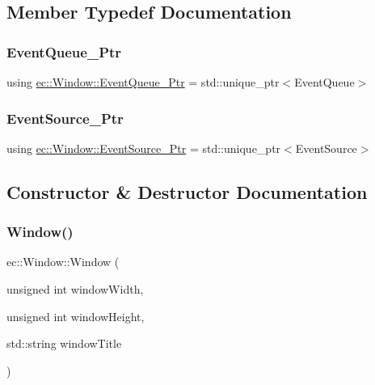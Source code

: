\subsection{Member Typedef Documentation}
\mbox{\label{classec_1_1_window_afe0927efdedc84c345120ae15bf6994a}} 
\subsubsection{\texorpdfstring{Event\+Queue\+\_\+\+Ptr}{EventQueue\_Ptr}}
{\footnotesize\ttfamily using \mbox{\hyperlink{classec_1_1_window_afe0927efdedc84c345120ae15bf6994a}{ec\+::\+Window\+::\+Event\+Queue\+\_\+\+Ptr}} =  std\+::unique\+\_\+ptr$<$Event\+Queue$>$}

\mbox{\label{classec_1_1_window_ae7501526590ece55dbe92ea496e62738}} 
\subsubsection{\texorpdfstring{Event\+Source\+\_\+\+Ptr}{EventSource\_Ptr}}
{\footnotesize\ttfamily using \mbox{\hyperlink{classec_1_1_window_ae7501526590ece55dbe92ea496e62738}{ec\+::\+Window\+::\+Event\+Source\+\_\+\+Ptr}} =  std\+::unique\+\_\+ptr$<$Event\+Source$>$}



\subsection{Constructor \& Destructor Documentation}
\mbox{\label{classec_1_1_window_a01bb029fa4964caf70553c5ca806d8cc}} 
\subsubsection{\texorpdfstring{Window()}{Window()}}
{\footnotesize\ttfamily ec\+::\+Window\+::\+Window (\begin{DoxyParamCaption}\item[{unsigned int}]{window\+Width,  }\item[{unsigned int}]{window\+Height,  }\item[{std\+::string}]{window\+Title }\end{DoxyParamCaption})\hspace{0.3cm}{\ttfamily [explicit]}}




